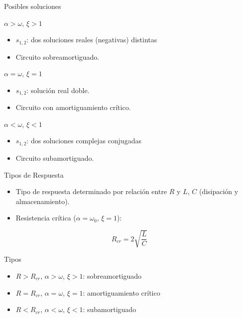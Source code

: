 \documentclass[xcolor={usenames,svgnames,dvipsnames}]{beamer}
\begin{document}
\begin{frame}[label={sec:orge896e08}]{Posibles soluciones}
\begin{block}{\(\alpha > \omega\), \(\xi > 1\)}
\begin{itemize}
\item \(s_{1,2}\): dos soluciones reales (negativas) distintas
\item Circuito \alert{sobreamortiguado}.
\end{itemize}
\end{block}

\begin{block}{\(\alpha = \omega\), \(\xi = 1\)}
\begin{itemize}
\item \(s_{1,2}\): solución real doble.
\item Circuito con \alert{amortiguamiento crítico}.
\end{itemize}
\end{block}

\begin{block}{\(\alpha < \omega\), \(\xi < 1\)}
\begin{itemize}
\item \(s_{1,2}\): dos soluciones complejas conjugadas
\item Circuito \alert{subamortiguado}.
\end{itemize}
\end{block}
\end{frame}

\begin{frame}[label={sec:org3d81218}]{Tipos de Respuesta}
\begin{itemize}
\item Tipo de respuesta determinado por relación entre \(R\) y \(L\), \(C\) (disipación y almacenamiento).
\item Resistencia crítica (\(\alpha = \omega_0\), \(\xi = 1\)):
\end{itemize}

\[
  R_{cr} = 2\sqrt{\frac{L}{C}}
\]

\begin{block}{Tipos}
\begin{itemize}
\item \(R > R_{cr}\), \(\alpha > \omega\), \(\xi > 1\): \alert{sobreamortiguado}
\item \(R = R_{cr}\),  \(\alpha = \omega\), \(\xi = 1\): \alert{amortiguamiento crítico}
\item \(R < R_{cr}\),  \(\alpha < \omega\), \(\xi < 1\): \alert{subamortiguado}
\end{itemize}
\end{block}
\end{frame}
\end{document}

